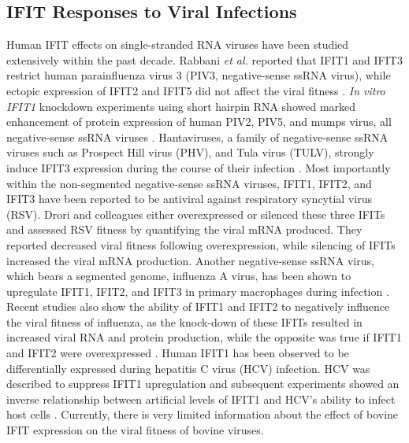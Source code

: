 \subsection{IFIT Responses to Viral Infections} \label{subsec:IFIT Responses to Viral Infections}
Human IFIT effects on single-stranded RNA viruses have been studied extensively within the past decade. Rabbani \textit{et al.} reported that IFIT1 and IFIT3 restrict human parainfluenza virus 3 (PIV3, negative-sense ssRNA virus), while ectopic expression of IFIT2 and IFIT5 did not affect the viral fitness \cite{Rabbani2016Identification3}. \textit{In vitro} \textit{IFIT1} knockdown experiments using short hairpin RNA showed marked enhancement of protein expression of human PIV2, PIV5, and mumps virus, all negative-sense ssRNA viruses \cite{Andrejeva2013ISG56/IFIT1Synthesis, Young2016HumanFamily}. Hantaviruses, a family of negative-sense ssRNA viruses such as Prospect Hill virus (PHV), and Tula virus (TULV), strongly induce IFIT3 expression during the course of their infection \cite{Matthys2011TheInduction}. Most importantly within the non-segmented negative-sense ssRNA viruses, IFIT1, IFIT2, and IFIT3 have been reported to be antiviral against respiratory syncytial virus (RSV). Drori and colleagues either overexpressed or silenced these three IFITs and assessed RSV fitness by quantifying the viral mRNA produced. They reported decreased viral fitness following overexpression, while silencing of IFITs increased the viral mRNA production. Another negative-sense ssRNA virus, which bears a segmented genome, influenza A virus, has been shown to upregulate IFIT1, IFIT2, and IFIT3 in primary macrophages during infection \cite{Lietzen2011QuantitativeMacrophages}. Recent studies also show the ability of IFIT1 and IFIT2 to negatively influence the viral fitness of influenza, as the knock-down of these IFITs resulted in increased viral RNA and protein production, while the opposite was true if IFIT1 and IFIT2 were overexpressed \cite{Zhu2023TheSynthesis}. Human IFIT1 has been observed to be differentially expressed during hepatitis C virus (HCV) infection. HCV was described to suppress IFIT1 upregulation and subsequent experiments showed an inverse relationship between artificial levels of IFIT1 and HCV's ability to infect host cells \cite{Raychoudhuri2011ISG56Replication, Ishida2019HepaticInfection}. Currently, there is very limited information about the effect of bovine IFIT expression on the viral fitness of bovine viruses.


